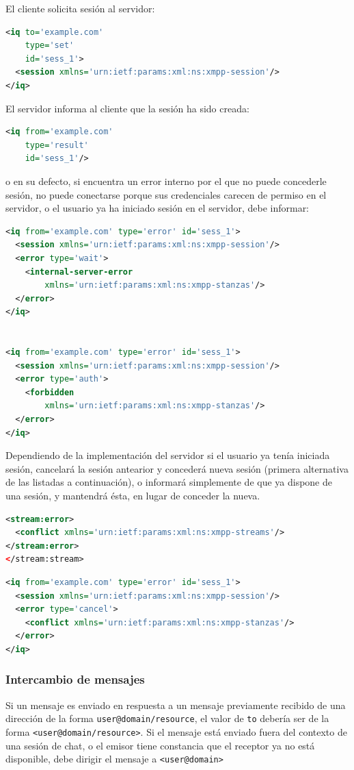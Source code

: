 \documentclass[a4paper, 11pt]{article} %
\begin{document}
    El cliente solicita sesión al servidor:
\begin{lstlisting}[language=XML]
<iq to='example.com'
    type='set'
    id='sess_1'>
  <session xmlns='urn:ietf:params:xml:ns:xmpp-session'/>
</iq>
\end{lstlisting}

    El servidor informa al cliente que la sesión ha sido creada:
\begin{lstlisting}[language=XML]   
<iq from='example.com'
    type='result'
    id='sess_1'/>
\end{lstlisting}

    o en su defecto, si encuentra un error interno por el que no puede concederle sesión, no puede conectarse porque
    sus credenciales carecen de permiso en el servidor, o el usuario ya ha iniciado sesión en el servidor, debe informar:
\begin{lstlisting}[language=XML]
<iq from='example.com' type='error' id='sess_1'>
  <session xmlns='urn:ietf:params:xml:ns:xmpp-session'/>
  <error type='wait'>
    <internal-server-error
        xmlns='urn:ietf:params:xml:ns:xmpp-stanzas'/>
  </error>
</iq>


<iq from='example.com' type='error' id='sess_1'>
  <session xmlns='urn:ietf:params:xml:ns:xmpp-session'/>
  <error type='auth'>
    <forbidden
        xmlns='urn:ietf:params:xml:ns:xmpp-stanzas'/>
  </error>
</iq>
\end{lstlisting}

    Dependiendo de la implementación del servidor si el usuario ya tenía iniciada sesión, cancelará la sesión antearior
    y concederá nueva sesión (primera alternativa de las listadas a continuación), o informará simplemente de que ya
    dispone de una sesión, y mantendrá ésta, en lugar de conceder la nueva.
    
\begin{lstlisting}[language=XML]
<stream:error>
  <conflict xmlns='urn:ietf:params:xml:ns:xmpp-streams'/>
</stream:error>
</stream:stream>
\end{lstlisting}
\begin{lstlisting}[language=XML]
<iq from='example.com' type='error' id='sess_1'>
  <session xmlns='urn:ietf:params:xml:ns:xmpp-session'/>
  <error type='cancel'>
    <conflict xmlns='urn:ietf:params:xml:ns:xmpp-stanzas'/>
  </error>
</iq>
\end{lstlisting}

    \subsubsection{Intercambio de mensajes}
      Si un mensaje es enviado en respuesta a un mensaje previamente recibido de una dirección de la forma 
      \texttt{user@domain/resource}, el valor de \texttt{to} debería ser de la forma \texttt{<user@domain/resource>}. Si el
      mensaje está enviado fuera del contexto de una sesión de chat, o el emisor tiene constancia que el receptor ya no
      está disponible, debe dirigir el mensaje a \texttt{<user@domain>}
      
\end{document}
